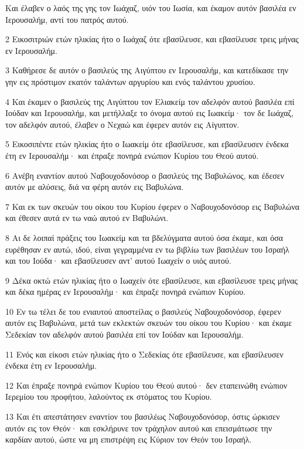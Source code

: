 \par Και έλαβεν ο λαός της γης τον Ιωάχαζ, υιόν του Ιωσία, και έκαμον αυτόν βασιλέα εν Ιερουσαλήμ, αντί του πατρός αυτού.
\par 2 Εικοσιτριών ετών ηλικίας ήτο ο Ιωάχαζ ότε εβασίλευσε, και εβασίλευσε τρεις μήνας εν Ιερουσαλήμ.
\par 3 Καθήρεσε δε αυτόν ο βασιλεύς της Αιγύπτου εν Ιερουσαλήμ, και κατεδίκασε την γην εις πρόστιμον εκατόν ταλάντων αργυρίου και ενός ταλάντου χρυσίου.
\par 4 Και έκαμεν ο βασιλεύς της Αιγύπτου τον Ελιακείμ τον αδελφόν αυτού βασιλέα επί Ιούδαν και Ιερουσαλήμ, και μετήλλαξε το όνομα αυτού εις Ιωακείμ· τον δε Ιωάχαζ, τον αδελφόν αυτού, έλαβεν ο Νεχαώ και έφερεν αυτόν εις Αίγυπτον.
\par 5 Εικοσιπέντε ετών ηλικίας ήτο ο Ιωακείμ ότε εβασίλευσε, και εβασίλευσεν ένδεκα έτη εν Ιερουσαλήμ· και έπραξε πονηρά ενώπιον Κυρίου του Θεού αυτού.
\par 6 Ανέβη εναντίον αυτού Ναβουχοδονόσορ ο βασιλεύς της Βαβυλώνος, και έδεσεν αυτόν με αλύσεις, διά να φέρη αυτόν εις Βαβυλώνα.
\par 7 Και εκ των σκευών του οίκου του Κυρίου έφερεν ο Ναβουχοδονόσορ εις Βαβυλώνα και έθεσεν αυτά εν τω ναώ αυτού εν Βαβυλώνι.
\par 8 Αι δε λοιπαί πράξεις του Ιωακείμ και τα βδελύγματα αυτού όσα έκαμε, και όσα ευρέθησαν εν αυτώ, ιδού, είναι γεγραμμένα εν τω βιβλίω των βασιλέων του Ισραήλ και του Ιούδα· και εβασίλευσεν αντ' αυτού Ιωαχείν ο υιός αυτού.
\par 9 Δέκα οκτώ ετών ηλικίας ήτο ο Ιωαχείν ότε εβασίλευσε, και εβασίλευσε τρεις μήνας και δέκα ημέρας εν Ιερουσαλήμ· και έπραξε πονηρά ενώπιον Κυρίου.
\par 10 Εν τω τέλει δε του ενιαυτού αποστείλας ο βασιλεύς Ναβουχοδονόσορ, έφερεν αυτόν εις Βαβυλώνα, μετά των εκλεκτών σκευών του οίκου του Κυρίου· και έκαμε Σεδεκίαν τον αδελφόν αυτού βασιλέα επί τον Ιούδαν και Ιερουσαλήμ.
\par 11 Ενός και είκοσι ετών ηλικίας ήτο ο Σεδεκίας ότε εβασίλευσε, και εβασίλευσεν ένδεκα έτη εν Ιερουσαλήμ.
\par 12 Και έπραξε πονηρά ενώπιον Κυρίου του Θεού αυτού· δεν εταπεινώθη ενώπιον Ιερεμίου του προφήτου, λαλούντος εκ στόματος του Κυρίου.
\par 13 Και έτι απεστάτησεν εναντίον του βασιλέως Ναβουχοδονόσορ, όστις ώρκισεν αυτόν εις τον Θεόν· και εσκλήρυνε τον τράχηλον αυτού και επεισμάτωσε την καρδίαν αυτού, ώστε να μη επιστρέψη εις Κύριον τον Θεόν του Ισραήλ.
